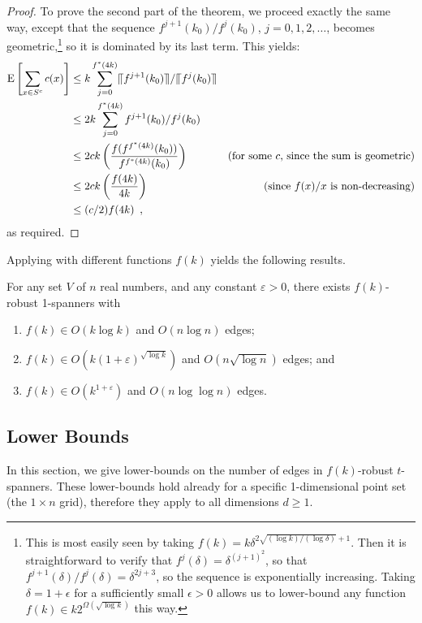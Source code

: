 \documentclass{patmorin}
\newcommand{\eps}{\varepsilon}
\begin{document}
\begin{proof}
  To prove the second part of the theorem, we proceed exactly the same
  way, except that the sequence $f^{j+1}(k_0)/f^j(k_0)$,
  $j=0,1,2,\ldots$, becomes
  geometric,\footnote{This is most easily seen by taking $f(k)
  = k\delta^{2\sqrt{(\log k)/(\log\delta)}+1}$.  Then it is
  straightforward to verify that $f^j(\delta) = \delta^{(j+1)^2}$, so
  that $f^{j+1}(\delta)/f^j(\delta)= \delta^{2j+3}$, so the sequence
  is exponentially increasing.  Taking $\delta = 1+\epsilon$ for a
  sufficiently small $\epsilon>0$ allows us to lower-bound any function
  $f(k)\in k2^{\Omega(\sqrt{\log k})}$ this way.} so it is dominated by
  its last term.  This yields:
  \begin{align*}
  \mathrm{E}\left[\sum_{x\in S^c} c(x)\right] 
      & \le  k \sum_{j=0}^{f^*(4k)} \llceil f^{j+1}(k_0)\rrceil/\llceil f^j(k_0)\rrceil \\
      & \le  2k \sum_{j=0}^{f^*(4k)} f^{j+1}(k_0)/f^j(k_0) \\
      & \le  2ck\left(\frac{f(f^{f^*(4k)}(k_0))}{f^{f^*(4k)}(k_0)}\right) 
            & \text{(for some $c$, since the sum is geometric)} \\
      & \le  2ck\left(\frac{f(4k)}{4k}\right) 
            & \text{(since $f(x)/x$ is non-decreasing)} \\
      & \le  (c/2)f(4k) \enspace ,
  \end{align*}
  as required.
\end{proof}


Applying  with different functions $f(k)$ yields the
following results.
\begin{cor}
  For any set $V$ of $n$ real numbers, and any constant $\eps >0$,
  there exists $f(k)$-robust 1-spanners with
  \begin{enumerate}
    \item $f(k)\in O(k\log k)$ and $O(n\log n)$ edges;
    \item $f(k)\in O(k(1+\eps)^{\sqrt{\log k}})$ and $O(n\sqrt{\log n})$
      edges; and
    \item $f(k)\in O(k^{1+\eps})$ and $O(n\log\log n)$ edges.
  \end{enumerate}
\end{cor}


\subsection{Lower Bounds}

In this section, we give lower-bounds on the number of edges in
$f(k)$-robust $t$-spanners.  These lower-bounds hold already for a
specific 1-dimensional point set (the $1\times n$ grid), therefore they
apply to all dimensions $d\ge 1$.
\end{document}
